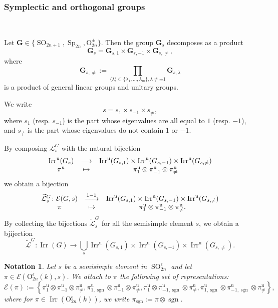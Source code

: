 \documentclass[12pt]{amsart}
\numberwithin{equation}{subsection}
\newtheorem{notation}[equation]{Notation}
\newcommand{\cE}{\mathcal{E}}
\newcommand{\cL}{\mathcal{L}}
\newcommand{\tcL}{{\widetilde{\cL}}}
\newcommand{\sgn}{\operatorname{sgn}}
\newcommand{\bG}{\mathbf{G}}
\newcommand{\unip}{\mathrm{u}}
\newcommand{\Irr}{\operatorname{Irr}}
\newcommand{\Sp}{\operatorname{Sp}}
\newcommand{\SO}{\operatorname{SO}}
\def\rO{{\mathrm{O}}}
\begin{document}
\subsubsection{Symplectic and orthogonal groups}\

Let $\bG\in\{\SO_{2n+1},\Sp_{2n}, \rO^\pm_{2n}\}$. Then the  group $\bG_s$ decomposes as a product
 \begin{equation}
 \bG_s=\bG_{s,1}\times \bG_{s,-1}\times \bG_{s,\ne},
 \end{equation}
 where
\begin{equation}
\bG_{s,\ne}:=\prod_{\langle\lambda\rangle\subset\{\lambda_1,\ldots,\lambda_m\},\lambda\ne\pm 1}\bG_{s,\lambda}
\end{equation}
is a product of general linear groups and unitary groups.

We write
\begin{equation} \label{decomp-s}
s=s_1\times s_{-1} \times s_{\neq},
\end{equation}
where $s_1$ (resp. $s_{-1}$) is the part whose eigenvalues are all equal to $1$ (resp. $-1$), and $s_{\neq}$ is the part whose 
eigenvalues do not contain $1$ or $-1$.

By composing $\cL_s^G$ with the natural bijection
\begin{equation} \label{eqn:Ls2}
\begin{matrix}
\Irr^\unip(G_s)&\longrightarrow &\Irr^\unip(G_{s,1})\times \Irr^\unip(G_{s,-1})\times\Irr^\unip(G_{s,\ne})\cr
\pi^\unip&\mapsto&\pi^\unip_{1}\otimes\pi^\unip_{-1}\otimes\pi^\unip_{\ne}
\end{matrix}
\end{equation}
we obtain a bijection
\begin{equation}\label{mod-Lus-unipotent-decomposition2}
\begin{matrix}
   {\tcL}_s^G\colon \mathcal{E}(G,s)&\xrightarrow{1-1}&\Irr^\unip(G_{s,1})\times \Irr^\unip(G_{s,-1})\times\Irr^\unip(G_{s,\ne}) \cr
    \pi&\mapsto& \pi^\unip_{1}\otimes\pi^\unip_{-1}\otimes\pi^\unip_{\ne}.
\end{matrix}
\end{equation}
By collecting the bijections $\tcL_s^G$ for all the semisimple element $s$, we obtain a bjijection 
\begin{equation} \label{eqn:JordanSpO}
\tcL^G\colon\Irr(G)\longrightarrow \bigcup_{s}\Irr^\unip(G_{s,1})\times \Irr^\unip(G_{s,-1})\times\Irr^\unip(G_{s,\ne}).
\end{equation}

\begin{notation} \label{notation:Epi}
{\rm
Let $s$ be a semisimple element in $\SO_{2n}^\epsilon$ and let $\pi\in\cE(\rO_{2n}^\epsilon(k),s)$. We attach to $\pi$ the following set of representations:
\[
\cE(\pi):=\left\{ \pi^\unip_{1}\otimes\pi^\unip_{-1}\otimes\pi^\unip_{\ne}, 
\pi^\unip_{1,\sgn}\otimes\pi^\unip_{-1}\otimes\pi^\unip_{\ne},
\pi^\unip_{1}\otimes\pi^\unip_{-1,\sgn}\otimes\pi^\unip_{\ne},
\pi^\unip_{1,\sgn}\otimes\pi^\unip_{-1,\sgn}\otimes\pi^\unip_{\ne}
\right\},
\]
where for  $\pi\in \Irr(\rO_{2n}^\epsilon(k))$, we write $\pi_{\sgn}:=\pi\otimes\sgn$.}
\end{notation}
\end{document}
